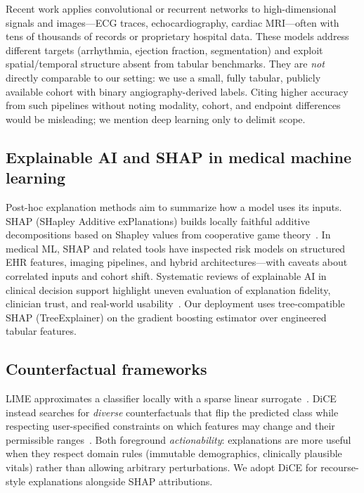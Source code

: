 \documentclass[11pt,a4paper]{article}
\begin{document}
Recent work applies convolutional or recurrent networks to high-dimensional signals and images—ECG traces, echocardiography, cardiac MRI—often with tens of thousands of records or proprietary hospital data. These models address different targets (arrhythmia, ejection fraction, segmentation) and exploit spatial/temporal structure absent from tabular benchmarks. They are \emph{not} directly comparable to our setting: we use a small, fully tabular, publicly available cohort with binary angiography-derived labels. Citing higher accuracy from such pipelines without noting modality, cohort, and endpoint differences would be misleading; we mention deep learning only to delimit scope.

\subsection{Explainable AI and SHAP in medical machine learning}

Post-hoc explanation methods aim to summarize how a model uses its inputs. SHAP (SHapley Additive exPlanations) builds locally faithful additive decompositions based on Shapley values from cooperative game theory~\cite{lundberg}. In medical ML, SHAP and related tools have inspected risk models on structured EHR features, imaging pipelines, and hybrid architectures—with caveats about correlated inputs and cohort shift. Systematic reviews of explainable AI in clinical decision support highlight uneven evaluation of explanation fidelity, clinician trust, and real-world usability~\cite{abbas2025}. Our deployment uses tree-compatible SHAP (TreeExplainer) on the gradient boosting estimator over engineered tabular features.

\subsection{Counterfactual frameworks}

LIME approximates a classifier locally with a sparse linear surrogate~\cite{lime}. DiCE instead searches for \emph{diverse} counterfactuals that flip the predicted class while respecting user-specified constraints on which features may change and their permissible ranges~\cite{dice}. Both foreground \emph{actionability}: explanations are more useful when they respect domain rules (immutable demographics, clinically plausible vitals) rather than allowing arbitrary perturbations. We adopt DiCE for recourse-style explanations alongside SHAP attributions.
\end{document}
